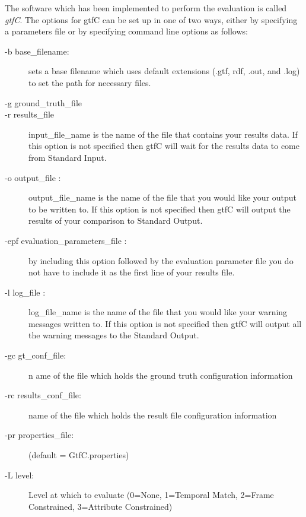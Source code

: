 The software which has been implemented to perform the evaluation is
called {\em gtfC}.  The options for gtfC can be set up in one of two
ways, either by specifying a parameters file or by specifying command
line options as follows:


\begin{description}

\item[-b base\_filename:] sets a base filename which uses default extensions (.gtf, rdf, .out, and .log)  to set the path for necessary files.
 

\item [-g ground\_truth\_file]

\item [-r results\_file]  input\_file\_name is the name of the file that
                    contains your results data. If this option is
                    not specified then gtfC will wait for
                    the results data to come from Standard Input.

\item [ -o output\_file : ] output\_file\_name is the name of the file that
                    you would like your output to be written to.
                    If this option is not specified then gtfC will
                    output the results of your comparison to 
                    Standard Output. 

\item [ -epf evaluation\_parameters\_file : ] by including this option followed by the evaluation parameter file you do not have to include it
                    as the first line of your results file.     

\item [ -l log\_file : ] log\_file\_name is the name of the file that you
                    would like your warning messages written to.
                    If this option is not specified then gtfC will
                    output all the warning messages to the Standard
                    Output.

\item [-gc gt\_conf\_file:]n ame of the file which holds the
            ground truth configuration information
\item [-rc   results\_conf\_file:] name of the file which holds the
            result file configuration information
  
\item [-pr   properties\_file:] (default = GtfC.properties)
\item [-L   level:] Level at which to evaluate
              (0=None, 1=Temporal Match, 2=Frame Constrained,
               3=Attribute Constrained)
\end{description}

